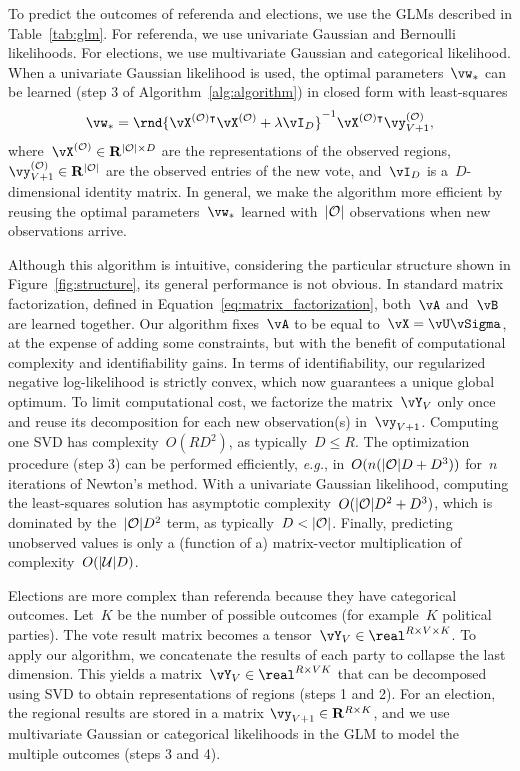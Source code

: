To predict the outcomes of referenda and elections, we use the GLMs described in Table~\ref{tab:glm}.
For referenda, we use univariate Gaussian and Bernoulli likelihoods.
For elections, we use multivariate Gaussian and categorical likelihood.
When a univariate Gaussian likelihood is used, the optimal parameters~$\vw_*$ can be learned (step 3 of Algorithm~\ref{alg:algorithm}) in closed form with least-squares
\begin{equation}
	\label{eq:least_squares}
	\vw_* = \rnd{\vX^{(\Obs)\intercal} \vX^{(\Obs)} + \lambda \vI_D }^{-1}\vX^{(\Obs)\intercal} \vy^{(\Obs)}_{V+1},
\end{equation}
where~$\vX^{(\Obs)} \in \mathbf{R}^{\vert \Obs \vert \times D}$ are the representations of the observed regions,~$\vy^{(\Obs)}_{V+1} \in \mathbf{R}^{\vert \Obs \vert}$ are the observed entries of the new vote, and~$\vI_D$ is a~$D$-dimensional identity matrix.
In general, we make the algorithm more efficient by reusing the optimal parameters~$\vw_*$ learned with~$\vert \mathcal{O} \vert$ observations when new observations arrive.

Although this algorithm is intuitive, considering the particular structure shown in Figure~\ref{fig:structure}, its general performance is not obvious.
In standard matrix factorization, defined in Equation~\eqref{eq:matrix_factorization}, both~$\vA$ and~$\vB$ are learned together.
Our algorithm fixes~$\vA$ to be equal to~$\vX = \vU \vSigma$, at the expense of adding some constraints, but with the benefit of computational complexity and identifiability gains.
In terms of identifiability, our regularized negative log-likelihood is strictly convex, which now guarantees a unique global optimum.
To limit computational cost, we factorize the matrix~$\vY_V$ only once and reuse its decomposition for each new observation(s) in~$\vy_{V+1}$.
Computing one SVD has complexity~$O(RD^2)$, as typically~$D \leq R$.
The optimization procedure (step 3) can be performed efficiently, \textit{e.g.}, in~$ O(n (\vert \mathcal{O} \vert D + D^3))$ for~$n$ iterations of Newton's method.
With a univariate Gaussian likelihood, computing the least-squares solution has asymptotic complexity~$O(\vert \mathcal{O} \vert D^2 + D^3)$, which is dominated by the~$\vert \mathcal{O} \vert D^2$ term, as typically~$D < \vert \mathcal{O} \vert$.
Finally, predicting unobserved values is only a (function of a) matrix-vector multiplication of complexity~$O(\vert \mathcal{U} \vert D)$.

Elections are more complex than referenda because they have categorical outcomes.
Let~$K$ be the number of possible outcomes (for example~$K$ political parties).
The vote result matrix becomes a tensor~$\vY_V \in \real^{R \times V \times K}$.
To apply our algorithm, we concatenate the results of each party to collapse the last dimension.
This yields a matrix~$\vY_V \in \real^{R \times VK}$ that can be decomposed using SVD to obtain representations of regions (steps 1 and 2).
For an election, the regional results are stored in a matrix \mbox{$\vy_{V+1} \in \mathbf{R}^{R \times K}$}, and we use multivariate Gaussian or categorical likelihoods in the GLM to model the multiple outcomes (steps 3 and 4).

